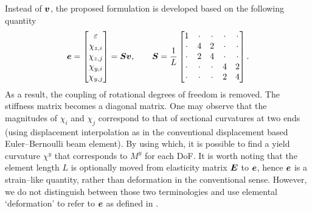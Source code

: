 Instead of $\bm{v}$, the proposed formulation is developed based on the following quantity
\begin{gather}\label{nm:kinematics}
\bm{e}=\begin{bmatrix}
\varepsilon\\\chi_{z,i}\\\chi_{z,j}\\\chi_{y,i}\\\chi_{y,j}
\end{bmatrix}=\bm{S}\bm{v},\qquad\bm{S}=\dfrac{1}{L}\begin{bmatrix}
1&\cdot&\cdot&\cdot&\cdot\\
\cdot&4&2&\cdot&\cdot\\
\cdot&2&4&\cdot&\cdot\\
\cdot&\cdot&\cdot&4&2\\
\cdot&\cdot&\cdot&2&4
\end{bmatrix}.
\end{gather}
As a result, the coupling of rotational degrees of freedom is removed. The stiffness matrix becomes a diagonal matrix.
One may observe that the magnitudes of $\chi_i$ and $\chi_j$ correspond to that of sectional curvatures at two ends (using displacement interpolation as in the conventional displacement based Euler--Bernoulli beam element).
By using which, it is possible to find a yield curvature $\chi^y$ that corresponds to $M^y$ for each DoF. It is worth noting that the element length $L$ is optionally moved from elasticity matrix $\bm{E}$ to $\bm{e}$, hence $\bm{e}$ is a strain--like quantity, rather than deformation in the conventional sense.
However, we do not distinguish between those two terminologies and use elemental `deformation' to refer to $\bm{e}$ as defined in .

